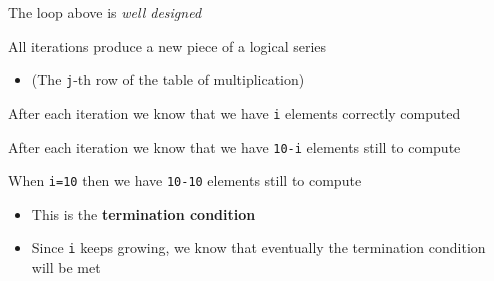 \documentclass{beamer}
\begin{document}

\begin{slide}{
\item The loop above is \textit{well designed}
\item All iterations produce a new piece of a logical series
\begin{itemize}
\item (The \texttt{j}-th row of the table of multiplication)
\end{itemize}
}\end{slide}

\begin{slide}{
\item After each iteration we know that we have \texttt{i} elements correctly computed
\item After each iteration we know that we have \texttt{10-i} elements still to compute
\item When \texttt{i=10} then we have \texttt{10-10} elements still to compute
\begin{itemize}
\item This is the \textbf{termination condition}
\item Since \texttt{i} keeps growing, we know that eventually the termination condition will be met
\end{itemize}
}\end{slide}
\end{document}
